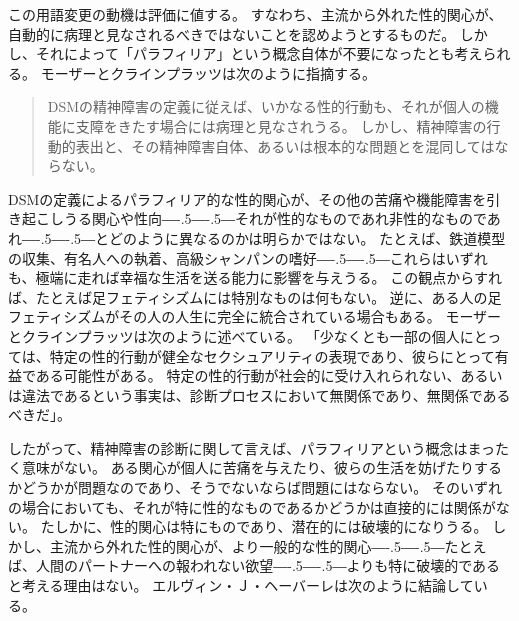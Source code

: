 \documentclass[paper=a4,book,openany]{jlreq}
\newcommand{\ig}[1]{}           %
\def\DDASH{―\kern-.5\zw―\kern-.5\zw―} %
\begin{document}
この用語変更の動機は評価に値する。
すなわち、主流から外れた性的関心が、自動的に病理と見なされるべきではないことを認めようとするものだ。
しかし、それによって「パラフィリア」という概念自体が不要になったとも考えられる。
モーザーとクラインプラッツは次のように指摘する。

\begin{quote}
  DSMの精神障害の定義に従えば、いかなる性的行動も、それが個人の機能に支障をきたす場合には病理と見なされうる。
しかし、精神障害の行動的表出と、その精神障害自体、あるいは根本的な問題とを混同してはならない。
\citep[p. 103]{moser05:_dsm_iv_tr_parap}\ig{診断と統計マニュアル}

\end{quote}

DSM\ig{診断と統計マニュアル}の定義によるパラフィリア的な性的関心が、その他の苦痛や機能障害を引き起こしうる関心や性向{\DDASH}それが性的なものであれ非性的なものであれ{\DDASH}とどのように異なるのかは明らかではない。
たとえば、鉄道模型の収集、有名人への執着、高級シャンパンの嗜好{\DDASH}これらはいずれも、極端に走れば幸福な生活を送る能力に影響を与えうる。
この観点からすれば、たとえば足フェティシズムには特別なものは何もない。
逆に、ある人の足フェティシズムがその人の人生に完全に統合されている場合もある。
モーザーとクラインプラッツは次のように述べている。
「少なくとも一部の個人にとっては、特定の性的行動が健全なセクシュアリティの表現であり、彼らにとって有益である可能性がある。
特定の性的行動が社会的に受け入れられない、あるいは違法であるという事実は、診断プロセスにおいて無関係であり、無関係であるべきだ」\citep[p.95]{moser05:_dsm_iv_tr_parap}。

したがって、精神障害の診断に関して言えば、パラフィリアという概念はまったく意味がない。
ある関心が個人に苦痛を与えたり、彼らの生活を妨げたりするかどうかが問題なのであり、そうでないならば問題にはならない。
そのいずれの場合においても、それが特に性的なものであるかどうかは直接的には関係がない。
たしかに、性的関心は特にものであり、潜在的には破壊的になりうる。
しかし、主流から外れた性的関心が、より一般的な性的関心{\DDASH}たとえば、人間のパートナーへの報われない欲望{\DDASH}よりも特に破壊的であると考える理由はない。
エルヴィン・Ｊ・ヘーバーレは次のように結論している。
\end{document}
